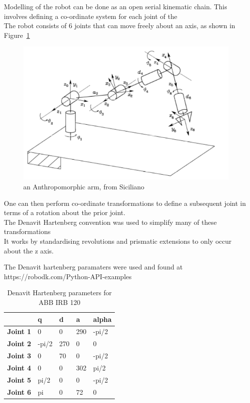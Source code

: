 \documentclass{UoNMCHA}
\numberwithin{equation}{section}
\begin{document}
Modelling of the robot can be done as an open serial kinematic chain. This involves defining a co-ordinate system for each joint of the \\
The robot consists of 6 joints that can move freely about an axis, as shown in Figure~\ref{fig:Anthro}

\begin{figure}[ht]
	\begin{center}
		\includegraphics[width=.6\linewidth]{Figures/Anthroarm}
		\caption{an Anthropomorphic arm, from Siciliano}
		\label{fig:Anthro}
	\end{center}
\end{figure}

One can then perform co-ordinate transformations to define a subsequent joint in terms of a rotation about the prior joint.\\
The Denavit Hartenberg convention was used to simplify many of these transformations\\
It works by standardising revolutions and prismatic extensions to only occur about the z axis.

The Denavit hartenberg paramaters were used and found at https://robodk.com/Python-API-examples

\begin{table}[h]
	\centering
	\caption{Denavit Hartenberg parameters for ABB IRB 120}
	\begin{tabular}{l|llll}
		& \textbf{q} & \textbf{d} & \textbf{a} & \textbf{alpha}  \\ 
		\hline
		\textbf{Joint 1} & 0          & 0          & 290        & -pi/2           \\ 
		\hline
		\textbf{Joint 2} & -pi/2      & 270        & 0          & 0               \\ 
		\hline
		\textbf{Joint 3} & 0          & 70         & 0          & -pi/2           \\ 
		\hline
		\textbf{Joint 4} & 0          & 0          & 302        & pi/2            \\ 
		\hline
		\textbf{Joint 5} & pi/2       & 0          & 0          & -pi/2           \\ 
		\hline
		\textbf{Joint 6} & pi         & 0          & 72         & 0               \\
		\hline
	\end{tabular}
\end{table}\
\end{document}

